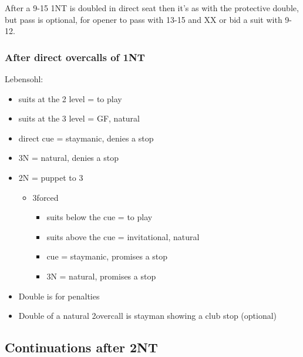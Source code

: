 \documentclass[a4paper,14pt]{extarticle}
\begin{document}
After a 9-15 1NT is doubled in direct seat then it's as with the protective double, but pass is optional, for opener to pass with 13-15 and XX or bid a suit with 9-12.

\subsubsection{After direct overcalls of 1NT}
\label{sec:resp:lebensohl}
\label{note:12}

Lebensohl:

\begin{itemize}
\item suits at the 2 level = to play
\item suits at the 3 level = GF, natural
\item direct cue = staymanic, denies a stop
\item 3N = natural, denies a stop
\item 2N = puppet to 3\clubs
	\begin{itemize}
	\item 3\clubs forced
		\begin{itemize}
		\item suits below the cue = to play
		\item suits above the cue = invitational, natural
		\item cue = staymanic, promises a stop
		\item 3N = natural, promises a stop
		\end{itemize}
	\end{itemize}
\item Double is for penalties
\item Double of a natural 2\clubs overcall is stayman showing a club stop (optional)
\end{itemize}

\newpage

\subsection{Continuations after 2NT}
\label{sec:resp:2n}
\end{document}
